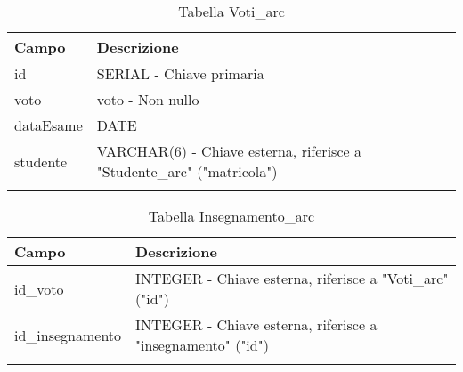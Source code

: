 \begin{table}[ht]
\centering
\caption{Tabella Voti\_arc}
\begin{tabularx}{\textwidth}{lX}
\toprule
\textbf{Campo} & \textbf{Descrizione} \\
\midrule
id & SERIAL - Chiave primaria \\
voto & voto - Non nullo \\
dataEsame & DATE \\
studente & VARCHAR(6) - Chiave esterna, riferisce a "Studente\_arc" ("matricola") \\
\bottomrule
\label{tab:votiArc}

\end{tabularx}
\end{table}

\begin{table}[ht]
\centering
\caption{Tabella Insegnamento\_arc}
\begin{tabularx}{\textwidth}{lX}
\toprule
\textbf{Campo} & \textbf{Descrizione} \\
\midrule
id\_voto & INTEGER - Chiave esterna, riferisce a "Voti\_arc" ("id") \\
id\_insegnamento & INTEGER - Chiave esterna, riferisce a "insegnamento" ("id") \\
\bottomrule
\label{tab:insegnamentoArc}

\end{tabularx}
\end{table}